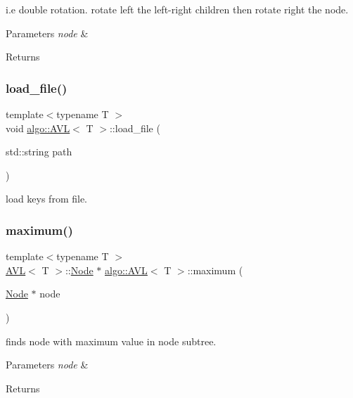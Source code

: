 i.\+e double rotation. rotate left the left-\/right children then rotate right the node. 
\begin{DoxyParams}{Parameters}
{\em node} & \\
\hline
\end{DoxyParams}
\begin{DoxyReturn}{Returns}

\end{DoxyReturn}
\mbox{\label{classalgo_1_1_a_v_l_a539cc5cc606074a81f5e81a743db2ae2}} 
\subsubsection{\texorpdfstring{load\+\_\+file()}{load\_file()}}
{\footnotesize\ttfamily template$<$typename T $>$ \\
void \hyperlink{classalgo_1_1_a_v_l}{algo\+::\+A\+VL}$<$ T $>$\+::load\+\_\+file (\begin{DoxyParamCaption}\item[{std\+::string}]{path }\end{DoxyParamCaption})}

load keys from file. \mbox{\label{classalgo_1_1_a_v_l_a83534f4b9ca490fba2394d3d649b2175}} 
\subsubsection{\texorpdfstring{maximum()}{maximum()}}
{\footnotesize\ttfamily template$<$typename T $>$ \\
\hyperlink{classalgo_1_1_a_v_l}{A\+VL}$<$ T $>$\+::\hyperlink{structalgo_1_1_a_v_l_1_1_node}{Node} $\ast$ \hyperlink{classalgo_1_1_a_v_l}{algo\+::\+A\+VL}$<$ T $>$\+::maximum (\begin{DoxyParamCaption}\item[{\hyperlink{structalgo_1_1_a_v_l_1_1_node}{Node} $\ast$}]{node }\end{DoxyParamCaption})}

finds node with maximum value in node subtree. 
\begin{DoxyParams}{Parameters}
{\em node} & \\
\hline
\end{DoxyParams}
\begin{DoxyReturn}{Returns}

\end{DoxyReturn}
\mbox{\label{classalgo_1_1_a_v_l_a2165bbf4dc551e536adee3d3018e9f20}} 
